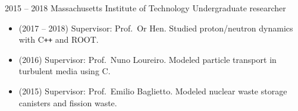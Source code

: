 


\cventry
  {2015 -- 2018}
  {Massachusetts Institute of Technology}
  {Undergraduate researcher}
  {}
  {}
  {\begin{itemize}
      \item (2017 -- 2018) Supervisor: Prof.~Or Hen. Studied proton/neutron dynamics with C\texttt{++} and ROOT.
      \item (2016) Supervisor: Prof.~Nuno Loureiro. Modeled particle transport in turbulent media using C.
      \item (2015) Supervisor: Prof.~Emilio Baglietto. Modeled nuclear waste storage canisters and fission waste.
  \end{itemize}}
